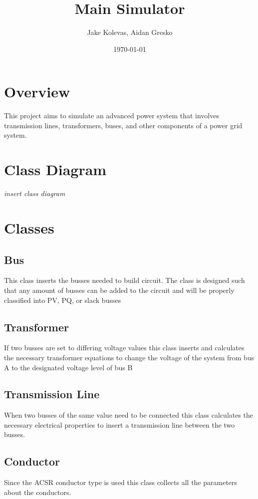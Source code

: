 \documentclass{article}
\author{Jake Kolevas, Aidan Gresko}
\title{Main Simulator}
\date{\today}
\begin{document}
	\maketitle
	
	\section{Overview}
	This project aims to simulate an advanced power system that involves transmission lines, transformers, buses, and other components of a power grid system.
	
	\section{Class Diagram}
	
	\textit{insert class diagram}
	
	\section{Classes}
	
	\subsection{Bus}
	This class inserts the busses needed to build circuit. The class is designed such that any amount of busses can be added to the circuit and will be properly classified into PV, PQ, or slack busses
	
	\subsection{Transformer}
	If two busses are set to differing voltage values this class inserts and calculates the necessary transformer equations to change the voltage of the system from bus A to the designated voltage level of bus B
	
	\subsection{Transmission Line}
	When two busses of the same value need to be connected this class calculates the necessary electrical properties to insert a transmission line between the two busses.
	
	\subsection{Conductor}
	Since the ACSR conductor type is used this class collects all the parameters about the conductors.
	
\end{document}
